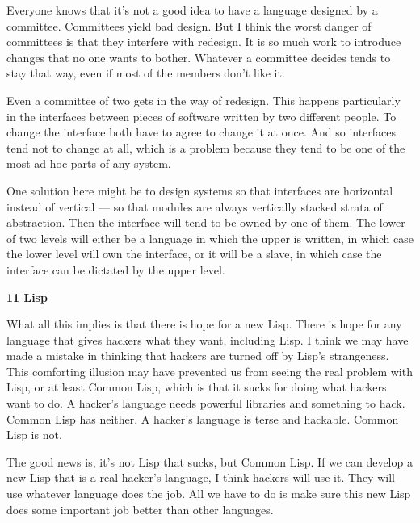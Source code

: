 Everyone knows that it's not a
                  good idea to have a language designed by a committee.
                  Committees yield bad design. But I think the worst danger of
                  committees is that they interfere with redesign. It is so much
                  work to introduce changes that no one wants to bother.
                  Whatever a committee decides tends to stay that way, even if
                  most of the members don't like it.

Even a committee
                  of two gets in the way of redesign. This happens particularly
                  in the interfaces between pieces of software written by two
                  different people. To change the interface both have to agree
                  to change it at once. And so interfaces tend not to change at
                  all, which is a problem because they tend to be one of the
                  most ad hoc parts of any system.

One solution here
                  might be to design systems so that interfaces are horizontal
                  instead of vertical --- so that modules are always
                  vertically stacked strata of abstraction. Then the interface
                  will tend to be owned by one of them. The lower of two levels
                  will either be a language in which the upper is written, in
                  which case the lower level will own the interface, or it will
                  be a slave, in which case the interface can be dictated by the
                  upper level.

\textbf{11 Lisp}

What all
                  this implies is that there is hope for a new Lisp. There is
                  hope for any language that gives hackers what they want,
                  including Lisp. I think we may have made a mistake in thinking
                  that hackers are turned off by Lisp's strangeness. This
                  comforting illusion may have prevented us from seeing the real
                  problem with Lisp, or at least Common Lisp, which is that it
                  sucks for doing what hackers want to do. A hacker's language
                  needs powerful libraries and something to hack. Common Lisp
                  has neither. A hacker's language is terse and hackable. Common
                  Lisp is not.

The good news is, it's not Lisp that
                  sucks, but Common Lisp. If we can develop a new Lisp that is a
                  real hacker's language, I think hackers will use it. They will
                  use whatever language does the job. All we have to do is make
                  sure this new Lisp does some important job better than other
                  languages.

